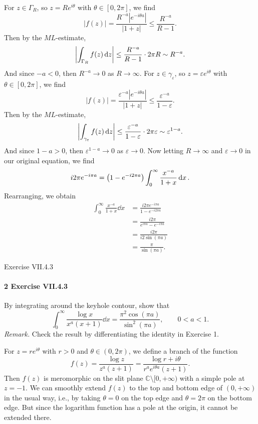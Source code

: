 \documentclass[12pt]{article}
\newenvironment{fullbox}{\begin{lrbox}{\savefullbox}\begin{minipage}{\dimexpr\textwidth-2\fboxsep\relax}}{\end{minipage}\end{lrbox}\begin{center}\framebox[\textwidth]{\usebox{\savefullbox}}\end{center}}
\newenvironment{pbox}[1][]{\begin{fullbox}\ifx#1\empty\else\paragraph{#1}\fi}{\end{fullbox}}
\theoremstyle{definition}
\newcommand{\C}{\mathbb{C}}
\newcommand{\eps}{\varepsilon}
\begin{document}
For $z \in \Gamma_R$, so $z = Re^{i\theta}$ with $\theta \in [0, 2\pi]$, we find
\[
    |f(z)|
        = \frac{R^{-a}|e^{-i\theta a}|}{|1 + z|}
        \leq \frac{R^{-a}}{R - 1}.
\]
Then by the $ML$-estimate,
\[
    \qty|\int_{\Gamma_R} f(z) \dd{z}|
        \leq \frac{R^{-a}}{R - 1} \cdot 2\pi R
        \sim R^{-a}.
\]
And since $-a < 0$, then $R^{-a} \to 0$ as $R \to \infty$. For $z \in \gamma_\eps$, so $z = \eps e^{i\theta}$ with $\theta \in [0, 2\pi]$, we find
\[
    |f(z)|
        = \frac{\eps^{-a}|e^{-i\theta a}|}{|1 + z|}
        \leq \frac{\eps^{-a}}{1 - \eps}.
\]
Then by the $ML$-estimate,
\[
    \qty|\int_{\gamma_\eps} f(z) \dd{z}|
        \leq \frac{\eps^{-a}}{1 - \eps} \cdot2\pi \eps
        \sim \eps^{1-a}.
\]
And since $1-a > 0$, then $\eps^{1-a} \to 0$ as $\eps \to 0$. Now letting $R \to \infty$ and $\eps \to 0$ in our original equation, we find
\[
    i2\pi e^{-i\pi a} = \qty(1 - e^{-i2\pi a})\int_{0}^{\infty} \frac{x^{-a}}{1 + x} \dd{x}.
\]
Rearranging, we obtain
\begin{align*}
    \int_{0}^{\infty} \frac{x^{-a}}{1 + x} \dd{x}
        &= \frac{i2\pi e^{-i\pi a}}{1 - e^{-i2\pi a}} \\
        &= \frac{i2\pi}{e^{i\pi a} - e^{-i\pi a}} \\
        &= \frac{i2\pi}{i2\sin(\pi a)} \\
        &= \frac{\pi}{\sin(\pi a)}.
\end{align*}








\newpage
\begin{pbox}[2 Exercise VII.4.3]
    By integrating around the keyhole contour, show that
    \[
        \int_{0}^{\infty} \frac{\log x}{x^a(x+1)} \dd{x} = \frac{\pi^2 \cos(\pi a)}{\sin^2(\pi a)}, \qquad 0 < a < 1.
    \]
    \textit{Remark.} Check the result by differentiating the identity in Exercise 1.
\end{pbox}

For $z = re^{i\theta}$ with $r > 0$ and $\theta \in (0, 2\pi)$, we define a branch of the function
\[
    f(z)
        = \frac{\log z}{z^a(z + 1)}
        = \frac{\log r + i\theta}{r^a e^{i\theta a}(z + 1)}.
\]
Then $f(z)$ is meromorphic on the slit plane $\C \setminus [0, +\infty)$ with a simple pole at $z = -1$. We can smoothly extend $f(z)$ to the top and bottom edge of $(0, +\infty)$ in the usual way, i.e., by taking $\theta = 0$ on the top edge and $\theta = 2\pi$ on the bottom edge. But since the logarithm function has a pole at the origin, it cannot be extended there.
\end{document}
